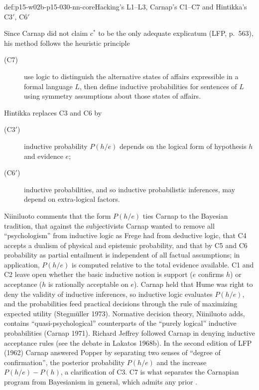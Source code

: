 \begin{hbdefinition}{def:p15-w02b-p15-030-nn-core}{Hacking's L1--L3, Carnap's C1--C7 and Hintikka's C3\('\), C6\('\)}
\begin{enumerate}[label=(\alph*)]
\end{enumerate}
Since Carnap did not claim \(c^*\) to be the only adequate explicatum
(LFP, p.~563), his method follows the heuristic principle
\begin{description}
\item[(C7)] use logic to distinguish the alternative states of affairs
  expressible in a formal language \(L\), then define inductive
  probabilities for sentences of \(L\) using symmetry assumptions about
  those states of affairs.
\end{description}
Hintikka replaces C3 and C6 by
\begin{description}
\item[(C3\('\))] inductive probability \(P(h/e)\) depends on the logical
  form of hypothesis \(h\) and evidence \(e\);
\item[(C6\('\))] inductive probabilities, and so inductive probabilistic
  inferences, may depend on extra-logical factors.
\end{description}
\cite[pp.~313--315]{Niiniluoto2011HintikkaProgramReading}
\end{hbdefinition}

Niiniluoto comments that the form \(P(h/e)\) ties Carnap to the Bayesian
tradition, that against the subjectivists Carnap wanted to remove all
``psychologism'' from inductive logic as Frege had from deductive logic,
that C4 accepts a dualism of physical and epistemic probability, and
that by C5 and C6 probability as partial entailment is independent of
all factual assumptions; in application, \(P(h/e)\) is computed relative
to the total evidence available. C1 and C2 leave open whether the basic
inductive notion is support (\(e\) confirms \(h\)) or acceptance (\(h\)
is rationally acceptable on \(e\)). Carnap held that Hume was right to
deny the validity of inductive inferences, so inductive logic evaluates
\(P(h/e)\), and the probabilities feed practical decisions through the
rule of maximizing expected utility (Stegmüller 1973). Normative decision
theory, Niiniluoto adds, contains ``quasi-psychological'' counterparts of
the ``purely logical'' inductive probabilities (Carnap 1971). Richard
Jeffrey followed Carnap in denying inductive acceptance rules (see the
debate in Lakatos 1968b). In the second
edition of LFP (1962) Carnap answered Popper by separating two senses of
``degree of confirmation'', the posterior probability \(P(h/e)\) and the
increase \(P(h/e)-P(h)\), a clarification of C3. C7 is what separates
the Carnapian program from Bayesianism in general, which admits any prior
\cite[pp.~313--314]{Niiniluoto2011HintikkaProgramReading}.

